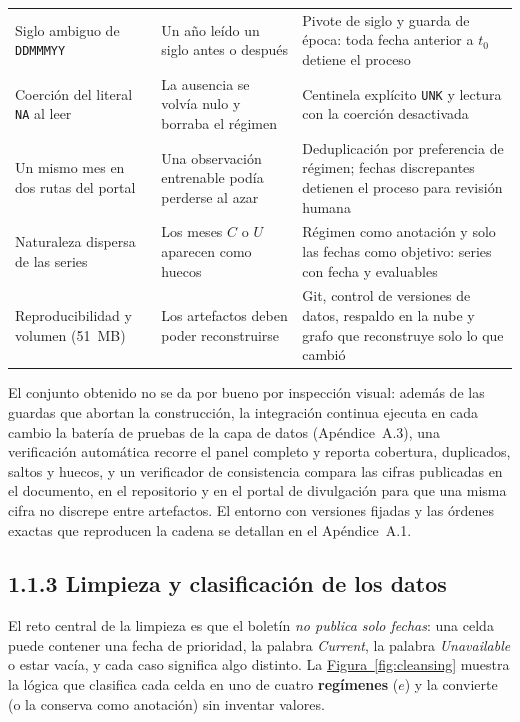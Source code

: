 \documentclass[12pt,letterpaper]{report}
\begin{document}
\begin{table}[htbp]
\begin{tabular}{>{\raggedright\arraybackslash}p{3.5cm}>{\raggedright\arraybackslash}p{3.6cm}>{\raggedright\arraybackslash}p{6.4cm}}
Siglo ambiguo de \texttt{DDMMMYY} & Un año leído un siglo antes o después & Pivote de siglo y guarda de época: toda fecha anterior a $t_0$ detiene el proceso \\
Coerción del literal \texttt{NA} al leer & La ausencia se volvía nulo y borraba el régimen & Centinela explícito \texttt{UNK} y lectura con la coerción desactivada \\
Un mismo mes en dos rutas del portal & Una observación entrenable podía perderse al azar & Deduplicación por preferencia de régimen; fechas discrepantes detienen el proceso para revisión humana \\
Naturaleza dispersa de las series & Los meses $C$ o $U$ aparecen como huecos & Régimen como anotación y solo las fechas como objetivo: \factNSeriesWithF{} series con fecha y \factNSeriesEvaluable{} evaluables \\
Reproducibilidad y volumen (51~MB) & Los artefactos deben poder reconstruirse & Git, control de versiones de datos, respaldo en la nube y grafo que reconstruye solo lo que cambió \\
\bottomrule
\end{tabular}
\end{table}

El conjunto obtenido no se da por bueno por inspección visual: además de las guardas que
abortan la construcción, la integración continua ejecuta en cada cambio la batería de
pruebas de la capa de datos (Apéndice~A.3), una verificación automática recorre el panel
completo y reporta cobertura, duplicados, saltos y huecos, y un verificador de consistencia
compara las cifras publicadas en el documento, en el repositorio y en el portal de
divulgación para que una misma cifra no discrepe entre artefactos. El entorno con versiones
fijadas y las órdenes exactas que reproducen la cadena se detallan en el Apéndice~A.1.

\subsection{1.1.3 Limpieza y clasificación de los datos}

El reto central de la limpieza es que el boletín \textit{no publica solo fechas}: una celda
puede contener una fecha de prioridad, la palabra \textit{Current}, la palabra
\textit{Unavailable} o estar vacía, y cada caso significa algo distinto. La
\hyperref[fig:cleansing]{Figura~\ref*{fig:cleansing}} muestra la lógica que clasifica cada celda en uno de cuatro
\textbf{regímenes} ($e$) y la convierte (o la conserva como anotación) sin inventar valores.
\end{document}
